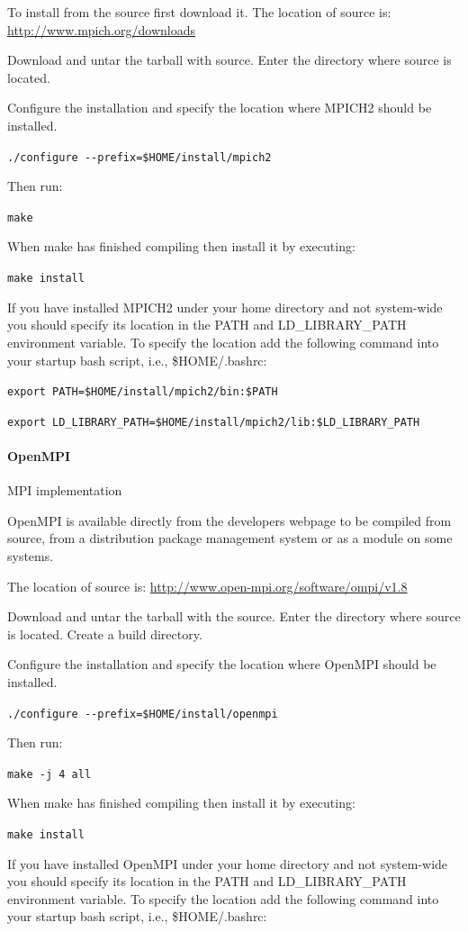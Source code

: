 \documentclass[11pt,a4paper, oneside]{book} %
\newcommand{\mpichurl}{\url{http://www.mpich.org/downloads} }
\newcommand{\openmpiurl}{\url{http://www.open-mpi.org/software/ompi/v1.8} }
\newcommand{\installloc}[1]{\$HOME/install/#1}
\begin{document}
To install from the source first download it.
The location of source is: \mpichurl

Download and untar the tarball with source.
Enter the directory where source is located.

Configure the installation and specify the location where MPICH2 should be
installed.

\texttt{./configure -{}-prefix=\installloc{mpich2}}

Then run:

\texttt{make}

When make has finished compiling then install it by executing:

\texttt{make install}

If you have installed MPICH2 under your home directory and not system-wide you
should specify its location in the PATH and LD\_LIBRARY\_PATH environment
variable. To specify the location add the following command into your startup
bash script, i.e., \$HOME/.bashrc:

\texttt{export PATH=\installloc{mpich2/bin}:\$PATH}

\texttt{export LD\_LIBRARY\_PATH=\installloc{mpich2/lib}:\$LD\_LIBRARY\_PATH}

\paragraph{OpenMPI} MPI implementation

OpenMPI is available directly from the developers webpage to be compiled from
source, from a distribution package management system or as a module on some
systems.

The location of source is:
\openmpiurl

Download and untar the tarball with the source.
Enter the directory where source is located.
Create a build directory.

Configure the installation and specify the location where OpenMPI should be installed.

\texttt{./configure -{}-prefix=\installloc{openmpi}}

Then run:

\texttt{make -j 4 all}

When make has finished compiling then install it by executing:

\texttt{make install}

If you have installed OpenMPI under your home directory and not system-wide you
should specify its location in the PATH and LD\_LIBRARY\_PATH environment
variable. To specify the location add the following command into your startup
bash script, i.e., \$HOME/.bashrc:
\end{document}
